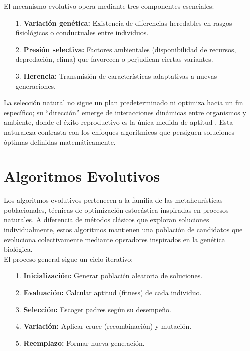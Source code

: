 \documentclass[letterpaper, 12pt]{report}
\begin{document}
El mecanismo evolutivo opera mediante tres componentes esenciales:

\begin{itemize}
\item[1.] \textbf{Variación genética:} Existencia de diferencias heredables en rasgos fisiológicos o conductuales entre individuos.
\item[2.] \textbf{Presión selectiva:} Factores ambientales (disponibilidad de recursos, depredación, clima) que favorecen o perjudican ciertas variantes.
\item[3.] \textbf{Herencia:} Transmisión de características adaptativas a nuevas generaciones.
\end{itemize}

La selección natural no sigue un plan predeterminado ni optimiza hacia un fin específico; su ``dirección'' emerge de interacciones dinámicas entre organismos y ambiente, donde el éxito reproductivo es la única medida de aptitud \cite{gould2002structure}. Esta naturaleza contrasta con los enfoques algorítmicos que persiguen soluciones óptimas definidas matemáticamente.




\section{Algoritmos Evolutivos}


Los algoritmos evolutivos pertenecen a la familia de las metaheurísticas poblacionales, técnicas de optimización estocástica inspiradas en procesos naturales. A diferencia de métodos clásicos que exploran soluciones individualmente, estos algoritmos mantienen una población de candidatos que evoluciona colectivamente mediante operadores inspirados en la genética biológica. \\

El proceso general sigue un ciclo iterativo:
\begin{itemize}
\item[1.] \textbf{Inicialización:} Generar población aleatoria de soluciones.  
\item[2.] \textbf{Evaluación:} Calcular aptitud (fitness) de cada individuo.  
\item[3.] \textbf{Selección:} Escoger padres según su desempeño.  
\item[4.] \textbf{Variación:} Aplicar cruce (recombinación) y mutación.
\item[5.] \textbf{Reemplazo:} Formar nueva generación.
\end{itemize}
\end{document}
